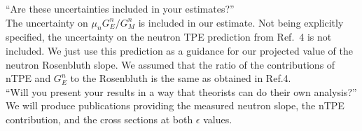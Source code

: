\documentclass[11pt]{article}
\begin{document}
``Are these uncertainties included in your estimates?''\\
The uncertainty on $\mu_n G_E^n/G_M^n$ %
is included in our estimate.
Not being explicitly specified, the uncertainty on the neutron TPE prediction from Ref.~4 is not included. We just use this prediction as a guidance for our projected value of the neutron Rosenbluth slope. We assumed that the ratio of the contributions of nTPE and $G_E^n$ to the Rosenbluth is the same as obtained in Ref.4. \\

``Will you present your results in a way that theorists can do their own analysis?''\\
We will produce publications providing the measured neutron slope, the nTPE contribution, and the cross sections at both $\epsilon$ values.
\end{document}
